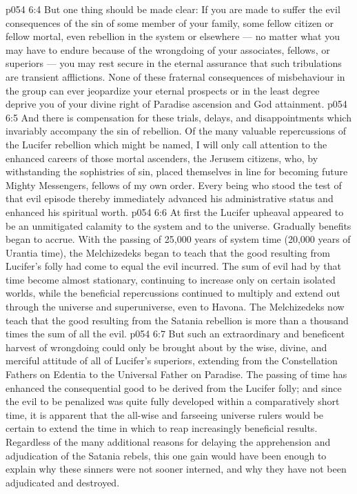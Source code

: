 \vs p054 6:4 But one thing should be made clear: If you are made to suffer the evil consequences of the sin of some member of your family, some fellow citizen or fellow mortal, even rebellion in the system or elsewhere --- no matter what you may have to endure because of the wrongdoing of your associates, fellows, or superiors --- you may rest secure in the eternal assurance that such tribulations are transient afflictions. None of these fraternal consequences of misbehaviour in the group can ever jeopardize your eternal prospects or in the least degree deprive you of your divine right of Paradise ascension and God attainment.
\vs p054 6:5 And there is compensation for these trials, delays, and disappointments which invariably accompany the sin of rebellion. Of the many valuable repercussions of the Lucifer rebellion which might be named, I will only call attention to the enhanced careers of those mortal ascenders, the Jerusem citizens, who, by withstanding the sophistries of sin, placed themselves in line for becoming future Mighty Messengers, fellows of my own order. Every being who stood the test of that evil episode thereby immediately advanced his administrative status and enhanced his spiritual worth.
\vs p054 6:6 \pc At first the Lucifer upheaval appeared to be an unmitigated calamity to the system and to the universe. Gradually benefits began to accrue. With the passing of 25,000 years of system time (20,000 years of Urantia time), the Melchizedeks began to teach that the good resulting from Lucifer’s folly had come to equal the evil incurred. The sum of evil had by that time become almost stationary, continuing to increase only on certain isolated worlds, while the beneficial repercussions continued to multiply and extend out through the universe and superuniverse, even to Havona. The Melchizedeks now teach that the good resulting from the Satania rebellion is more than a thousand times the sum of all the evil.
\vs p054 6:7 But such an extraordinary and beneficent harvest of wrongdoing could only be brought about by the wise, divine, and merciful attitude of all of Lucifer’s superiors, extending from the Constellation Fathers on Edentia to the Universal Father on Paradise. The passing of time has enhanced the consequential good to be derived from the Lucifer folly; and since the evil to be penalized was quite fully developed within a comparatively short time, it is apparent that the all\hyp{}wise and farseeing universe rulers would be certain to extend the time in which to reap increasingly beneficial results. Regardless of the many additional reasons for delaying the apprehension and adjudication of the Satania rebels, this one gain would have been enough to explain why these sinners were not sooner interned, and why they have not been adjudicated and destroyed.
